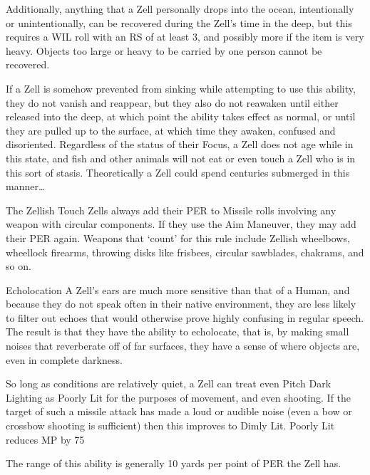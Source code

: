 \documentclass[oneside,11pt,english]{book}
\begin{document}
 

Additionally, anything that a Zell personally drops into the ocean, intentionally or 
unintentionally, can be recovered during the Zell's time in the deep, but this requires a WIL roll 
with an RS of at least 3, and possibly more if the item is very heavy. Objects too large or heavy to 
be carried by one person cannot be recovered. 

 

If a Zell is somehow prevented from sinking while attempting to use this ability, they do not 
vanish and reappear, but they also do not reawaken until either released into the deep, at which 
point the ability takes effect as normal, or until they are pulled up to the surface, at which time 
they awaken, confused and disoriented. Regardless of the status of their Focus, a Zell does not 
age while in this state, and fish and other animals will not eat or even touch a Zell who is in this 
sort of stasis. Theoretically a Zell could spend centuries submerged in this manner… 

 

The Zellish Touch 
Zells always add their PER to Missile rolls involving any weapon with circular components. If 
they use the Aim Maneuver, they may add their PER again. Weapons that ‘count’ for this rule 
include Zellish wheelbows, wheellock firearms, throwing disks like frisbees, circular sawblades, 
chakrams, and so on. 

 

Echolocation 
A Zell's ears are much more sensitive than that of a Human, and because they do not speak often 
in their native environment, they are less likely to filter out echoes that would otherwise prove 
highly confusing in regular speech. The result is that they have the ability to echolocate, that is, 
by making small noises that reverberate off of far surfaces, they have a sense of where objects 
are, even in complete darkness. 

 

So long as conditions are relatively quiet, a Zell can treat even Pitch Dark Lighting as Poorly Lit 
for the purposes of movement, and even shooting. If the target of such a missile attack has made a 
loud or audible noise (even a bow or crossbow shooting is sufficient) then this improves to Dimly 
Lit. Poorly Lit reduces MP by 75%

 

The range of this ability is generally 10 yards per point of PER the Zell has. 
\end{document}
